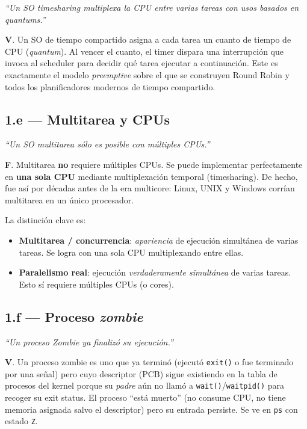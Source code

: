 \documentclass[11pt,a4paper]{article}
\begin{document}
\emph{``Un SO \emph{timesharing} multiplexa la CPU entre varias tareas
con usos basados en \emph{quantums}.''}

\begin{respuesta}
\textbf{V}. Un SO de tiempo compartido asigna a cada tarea un cuanto
de tiempo de CPU (\emph{quantum}). Al vencer el cuanto, el timer
dispara una interrupción que invoca al scheduler para decidir qué
tarea ejecutar a continuación. Este es exactamente el modelo
\emph{preemptive} sobre el que se construyen Round Robin y todos los
planificadores modernos de tiempo compartido.
\end{respuesta}

\subsection*{1.e --- Multitarea y CPUs}

\emph{``Un SO \emph{multitarea} sólo es posible con múltiples CPUs.''}

\begin{respuesta}
\textbf{F}. Multitarea \textbf{no} requiere múltiples CPUs. Se puede
implementar perfectamente en \textbf{una sola CPU} mediante
multiplexación temporal (timesharing). De hecho, fue así por décadas
antes de la era multicore: Linux, UNIX y Windows corrían multitarea en
un único procesador.

La distinción clave es:

\begin{itemize}[leftmargin=*,nosep]
    \item \textbf{Multitarea / concurrencia}: \emph{apariencia} de
        ejecución simultánea de varias tareas. Se logra con una sola
        CPU multiplexando entre ellas.
    \item \textbf{Paralelismo real}: ejecución \emph{verdaderamente
        simultánea} de varias tareas. Esto sí requiere múltiples CPUs
        (o cores).
\end{itemize}
\end{respuesta}

\subsection*{1.f --- Proceso \emph{zombie}}

\emph{``Un proceso Zombie ya finalizó su ejecución.''}

\begin{respuesta}
\textbf{V}. Un proceso zombie es uno que ya terminó (ejecutó
\texttt{exit()} o fue terminado por una señal) pero cuyo descriptor
(PCB) sigue existiendo en la tabla de procesos del kernel porque su
\emph{padre} aún no llamó a \texttt{wait()}/\texttt{waitpid()} para
recoger su exit status. El proceso ``está muerto'' (no consume CPU, no
tiene memoria asignada salvo el descriptor) pero su entrada persiste.
Se ve en \texttt{ps} con estado \texttt{Z}.
\end{respuesta}
\end{document}
